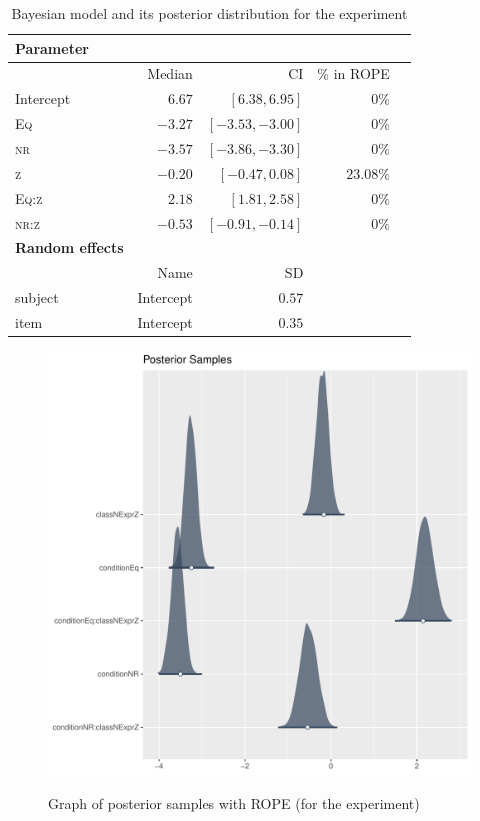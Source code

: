 \begin{table}[htbp]
  \centering
  \begin{tabularx}{.9\textwidth}{lrrrr}
  \toprule
  \textbf{Parameter}&\\\midrule
    &            Median & CI &  \% in ROPE\\  
    Intercept               &$6.67$   &$[6.38,6.95]$ &$0\%$\\  
    \textsc{Eq}               &$-3.27$   &$[-3.53,-3.00]$ &$0\%$\\  
    \textsc{nr}               &$-3.57$   &$[-3.86, -3.30]$ &  $0\%$\\  
    \textsc{z}               &$-0.20$   &$[-0.47,  0.08]$ &$23.08\%$\\  
    \textsc{Eq:z}               &$2.18$   &$[1.81,  2.58]$   &$0\%$\\
    \textsc{nr:z}               &$-0.53$   &$[-0.91, -0.14]$   &$0\%$\\  
    \bottomrule
    \textbf{Random effects}&\\\midrule
    & Name &SD\\
    subject&Intercept&$0.57$\\
    item&Intercept&$0.35$\\
  \bottomrule
  \end{tabularx}
  \caption{Bayesian model and its posterior distribution for the experiment}%
  \label{tab:exp1}
\end{table}

\begin{figure}
  \centering
  \caption{Graph of posterior samples with ROPE (for the experiment)}
  \includegraphics[scale=0.6]{posterior_graph.pdf}
  \label{fig-rope}
\end{figure}


